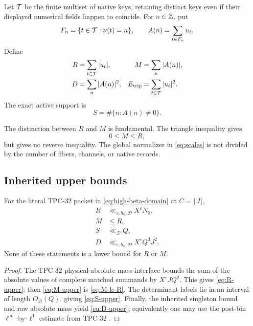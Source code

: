 \begin{definition}
\label{def:fibers}
Let \(\mathcal T\) be the finite multiset of native keys, retaining distinct
keys even if their displayed numerical fields happen to coincide.
For \(n\in\mathbb Z\), put
\begin{equation}
 F_n=\{t\in\mathcal T:\nu(t)=n\},\qquad
 A(n)=\sum_{t\in F_n}u_t .
\label{eq:fiber-coefficient}
\end{equation}
Define
\begin{align}
 R&=\sum_{t\in\mathcal T}|u_t|,
 &M&=\sum_n|A(n)|,\label{eq:raw-post-masses}\\
 D&=\sum_n|A(n)|^2,
 &E_{\mathrm{trip}}&=\sum_{t\in\mathcal T}|u_t|^2.
\label{eq:energies}
\end{align}
The exact active support is
\[
 S=\#\{n:A(n)\ne0\}.
\]
\end{definition}

The distinction between \(R\) and \(M\) is fundamental.  The triangle
inequality gives
\begin{equation}
 0\le M\le R,
\label{eq:M-le-R}
\end{equation}
but gives no reverse inequality.  The global normalizer in
\eqref{eq:scales} is not divided by the number of fibers, channels,
or native records.

\subsection{Inherited upper bounds}

\begin{proposition}
\label{prop:available-upper}
For the literal TPC-32 packet in
\eqref{eq:high-beta-domain} at \(C=\lfloor J\rfloor\),
\begin{align}
 R&\ll_{\varepsilon,h_0,\mathscr D}X^\varepsilon N_0,
\label{eq:R-upper}\\
 M&\le R,\label{eq:M-upper}\\
 S&\ll_{\mathscr D}Q,\label{eq:S-upper}\\
 D&\ll_{\varepsilon,h_0,\mathscr D}
 X^\varepsilon Q^3J^2.
\label{eq:D-upper}
\end{align}
None of these statements is a lower bound for \(R\) or \(M\).
\end{proposition}

\begin{proof}
The TPC-32 physical absolute-mass interface bounds the sum of the
absolute values of complete matched summands by
\(X^\varepsilon JQ^2\).  This gives \eqref{eq:R-upper}; then
\eqref{eq:M-upper} is \eqref{eq:M-le-R}.  The determinant labels lie
in an interval of length \(O_{\mathscr D}(Q)\), giving
\eqref{eq:S-upper}.  Finally, the inherited singleton bound and raw
absolute mass yield \eqref{eq:D-upper}; equivalently one may use the
post-bin \(\ell^\infty\)-by-\(\ell^1\) estimate from TPC-32
\citep{WangTPC32,WangTPC83}.
\end{proof}

